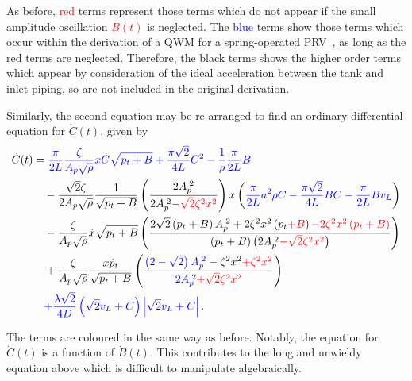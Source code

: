 As before, \textcolor{Red}{red} terms represent those terms which do not appear if the small amplitude oscillation \textcolor{Red}{$B(t)$} is neglected. The \textcolor{Blue}{blue} terms show those terms which occur within the derivation of a QWM for a spring-operated PRV~\cite{Hos2015ModelPipe}, as long as the red terms are neglected. Therefore, the black terms shows the higher order terms which appear by consideration of the ideal acceleration between the tank and inlet piping, so are not included in the original derivation.

Similarly, the second equation may be re-arranged to find an ordinary differential equation for $\dot{C}(t)$, given by
~
\begin{equation} \label{eq: QWMFullDiffC}
\begin{split}
    \dot{C}(t) &=
    \textcolor{Blue}{
    \frac{\pi}{2L} \frac{\zeta}{A_p \sqrt{\rho}} x C \sqrt{p_t + B}
    + \frac{\pi \sqrt{2}}{4 L} C^2
    - \frac{1}{\rho} \frac{\pi}{2L} B
    } \\ & \quad %
    - \frac{\sqrt{2} \zeta}{2 A_p \sqrt{\rho}} \frac{1}{\sqrt{p_t+B}} \left( \frac{2 A_p\power{2}}{2 A_p\power{2} \textcolor{Red}{- \sqrt{2} \zeta^2 x^2}} \right) x \left(
    \textcolor{Blue}{
    \frac{\pi}{2L} a^2 \rho C
    - \frac{\pi \sqrt{2}}{4 L} B C
    - \frac{\pi}{2L} B v_L }
    \right)
    \\ & \quad %
    - \frac{\zeta}{A_p \sqrt{\rho}} \dot{x} \sqrt{p_t + B} \left( 
    \frac{ 2 \sqrt{2} \left( p_t + B \right) A_p\power{2} + 2 \zeta^2 x^2 \left( p_t \textcolor{red}{+ B} \right) \textcolor{Red}{- 2 \zeta^2 x^2 \left( p_t + B \right)} }
    { \left( p_t + B \right) \left( 2 A_p\power{2} \textcolor{Red}{- \sqrt{2} \zeta^2 x^2} \right) }
    \right)
    \\ & \quad %
    + \frac{\zeta}{A_p \sqrt{\rho}} \frac{x \dot{p}_t}{\sqrt{p_t+B}} \left( \frac{
    \textcolor{Blue}{\left( 2 - \sqrt{2} \right) A_p\power{2}}
    - \zeta^2 x^2 \textcolor{Red}{+ \zeta^2 x^2}}{
    \textcolor{Blue}{2 A_p\power{2}}
    \textcolor{Red}{+ \sqrt{2} \zeta^2 x^2}} \right)
    \\ & \quad %
    \textcolor{Blue}{
    + \frac{\lambda \sqrt{2}}{4 D} \left( \sqrt{2} v_L + C \right) \left| \sqrt{2} v_L + C \right| } \, .
\end{split}
\end{equation}

The terms are coloured in the same way as before. Notably, the equation for $\dot{C}(t)$ is a function of $\dot{B}(t)$. This contributes to the long and unwieldy equation above which is difficult to manipulate algebraically.

